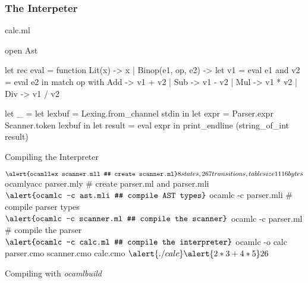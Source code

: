 \documentclass{plt}
\begin{document}
\begin{frame}[fragile]
  \frametitle{The Interpeter}

calc.ml

\vspace{4pt}

\begin{ocaml}
open Ast

let rec eval = function 
    Lit(x) -> x
  | Binop(e1, op, e2) ->
      let v1 = eval e1 and v2 = eval e2 in
      match op with
        Add -> v1 + v2
      | Sub -> v1 - v2
      | Mul -> v1 * v2
      | Div -> v1 / v2

let _ =
  let lexbuf = Lexing.from_channel stdin in
  let expr = Parser.expr Scanner.token lexbuf in
  let result = eval expr in
  print_endline (string_of_int result)
\end{ocaml}

\end{frame}

\begin{frame}[fragile]{Compiling the Interpreter}

\begin{semiverbatim}
$ \alert{ocamllex scanner.mll # create scanner.ml}
8 states, 267 transitions, table size 1116 bytes
$ \alert{ocamlyacc parser.mly # create parser.ml and parser.mli}
$ \alert{ocamlc -c ast.mli    # compile AST types}
$ \alert{ocamlc -c parser.mli # compile parser types}
$ \alert{ocamlc -c scanner.ml # compile the scanner}
$ \alert{ocamlc -c parser.ml  # compile the parser}
$ \alert{ocamlc -c calc.ml    # compile the interpreter}
$ \alert{ocamlc -o calc parser.cmo scanner.cmo calc.cmo}
$ \alert{./calc}
\alert{2 * 3 + 4 * 5}
26
$
\end{semiverbatim}

\end{frame}

\begin{frame}[fragile]{Compiling with \emph{ocamlbuild}}

  
\end{frame}
\end{document}
